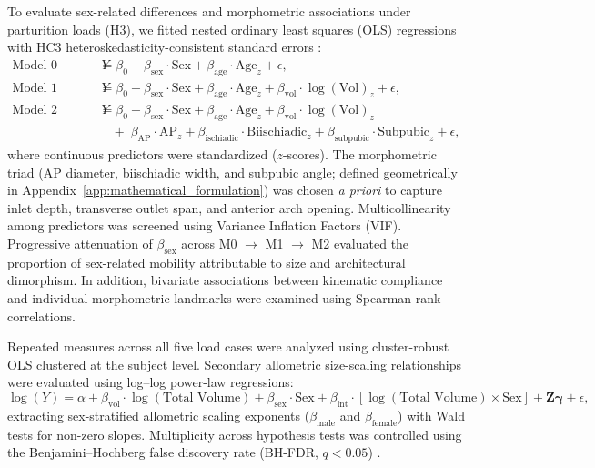 To evaluate sex-related differences and morphometric associations under parturition loads (H3), we fitted nested ordinary least squares (OLS) regressions with HC3 heteroskedasticity-consistent standard errors \citep{White1980,MacKinnonWhite1985}:
\begin{align}
\text{Model 0 (M0):}\quad Y &= \beta_0 + \beta_{\text{sex}}\cdot\text{Sex} + \beta_{\text{age}}\cdot\text{Age}_z + \epsilon, \label{eq:m0} \\
\text{Model 1 (M1):}\quad Y &= \beta_0 + \beta_{\text{sex}}\cdot\text{Sex} + \beta_{\text{age}}\cdot\text{Age}_z + \beta_{\text{vol}}\cdot\log(\text{Vol})_z + \epsilon, \label{eq:m1} \\
\text{Model 2 (M2):}\quad Y &= \beta_0 + \beta_{\text{sex}}\cdot\text{Sex} + \beta_{\text{age}}\cdot\text{Age}_z + \beta_{\text{vol}}\cdot\log(\text{Vol})_z \nonumber \\
  &\quad +\; \beta_{\text{AP}}\cdot\text{AP}_z + \beta_{\text{ischiadic}}\cdot\text{Biischiadic}_z + \beta_{\text{subpubic}}\cdot\text{Subpubic}_z + \epsilon, \label{eq:m2}
\end{align}
where continuous predictors were standardized ($z$-scores). The morphometric triad (AP diameter, biischiadic width, and subpubic angle; defined geometrically in Appendix~\ref{app:mathematical_formulation}) was chosen \emph{a priori} to capture inlet depth, transverse outlet span, and anterior arch opening. Multicollinearity among predictors was screened using Variance Inflation Factors (VIF). Progressive attenuation of $\beta_{\text{sex}}$ across M0 $\to$ M1 $\to$ M2 evaluated the proportion of sex-related mobility attributable to size and architectural dimorphism. In addition, bivariate associations between kinematic compliance and individual morphometric landmarks were examined using Spearman rank correlations.

Repeated measures across all five load cases were analyzed using cluster-robust OLS clustered at the subject level. Secondary allometric size-scaling relationships were evaluated using log--log power-law regressions:
\begin{equation}
\log(Y) = \alpha + \beta_{\text{vol}}\cdot\log(\text{Total Volume}) + \beta_{\text{sex}}\cdot\text{Sex} + \beta_{\text{int}}\cdot[\log(\text{Total Volume})\times\text{Sex}] + \mathbf{Z}\boldsymbol{\gamma} + \epsilon,
\end{equation}
extracting sex-stratified allometric scaling exponents ($\beta_{\text{male}}$ and $\beta_{\text{female}}$) with Wald tests for non-zero slopes. Multiplicity across hypothesis tests was controlled using the Benjamini--Hochberg false discovery rate (BH-FDR, $q < 0.05$) \citep{BenjaminiHochberg1995}.
